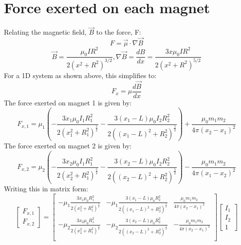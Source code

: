\documentclass[english]{article}
\begin{document}
%

\section{Force exerted on each magnet}
Relating the magnetic field, $\vec{B}$ to the force, F:
$$F = \vec{\mu}\cdot\nabla\vec{B}$$
$$\vec{B} = \frac{\mu_0 I R^2}{2 \left(x^2 + R^2\right)^{3/2}}, \nabla\vec{B} = \frac{dB}{dx} =  \frac{3x\mu_0IR^2}{2\left(x^2 + R^2\right)^{5/2}}$$
For a 1D system as shown above, this simplifies to:
$$F_x = \mu\frac{d\vec{B}}{dx}$$
The force exerted on magnet 1 is given by:
$$F_{x,1} = \mu_1\left(-\frac{3 x_1 \mu_0 I_1 R_{1}^{2}}{2\left(x_1^2 + R_1^2 \right)^{\frac{5}{2}}} - \frac{3 \left( x_1 - L \right) \mu_0 I_2 R_{2}^{2}}{2\left(\left(x_1 - L \right)^2 + R_2^2 \right)^{\frac{5}{2}}} \right) + \frac{\mu_0 m_1 m_2}{4 \pi \left(x_2-x_1\right)^2}$$
The force exerted on magnet 2 is given by:
$$F_{x,2} = \mu_2\left(-\frac{3 x_2 \mu_0 I_1 R_{1}^{2}}{2\left(x_2^2 + R_1^2 \right)^{\frac{5}{2}}} - \frac{3 \left( x_2 - L \right) \mu_0 I_2 R_{2}^{2}}{2\left(\left(x_2 - L \right)^2 + R_2^2 \right)^{\frac{5}{2}}} \right) - \frac{\mu_0 m_1 m_2}{4 \pi \left(x_1-x_2\right)^2}$$
Writing this in matrix form:
\begin{equation}
\begin{bmatrix}
	F_{x,1}\\[0.3em]
	F_{x,2}	
\end{bmatrix}
=
\begin{bmatrix}
			-\mu_1\frac{3 x_1 \mu_0 R_{1}^{2}}{2\left(x_1^2 + R_1^2 \right)^{\frac{5}{2}}}  & -\mu_1\frac{3 \left( x_1 - L \right) \mu_0 R_{2}^{2}}{2\left(\left(x_1 - L \right)^2 + R_2^2 \right)^{\frac{5}{2}}} & 	\frac{\mu_0 m_1 m_2}{4\pi \left(x_2-x_1\right)^2}\\
			-\mu_2\frac{3 x_2 \mu_0 R_{1}^{2}}{2\left(x_2^2 + R_1^2 \right)^{\frac{5}{2}}} & -\mu_2\frac{3 \left( x_2 - L \right) \mu_0 R_{2}^{2}}{2\left(\left(x_2 - L \right)^2 + R_2^2 \right)^{\frac{5}{2}}} & 	-\frac{\mu_0 m_1 m_2}{4\pi \left(x_2-x_1\right)^2}\\
\end{bmatrix}
\begin{bmatrix}
	I_1\\ I_2 \\ 1
\end{bmatrix}
\label{eq:ForceMatrix_general}
\end{equation}
\end{document}
